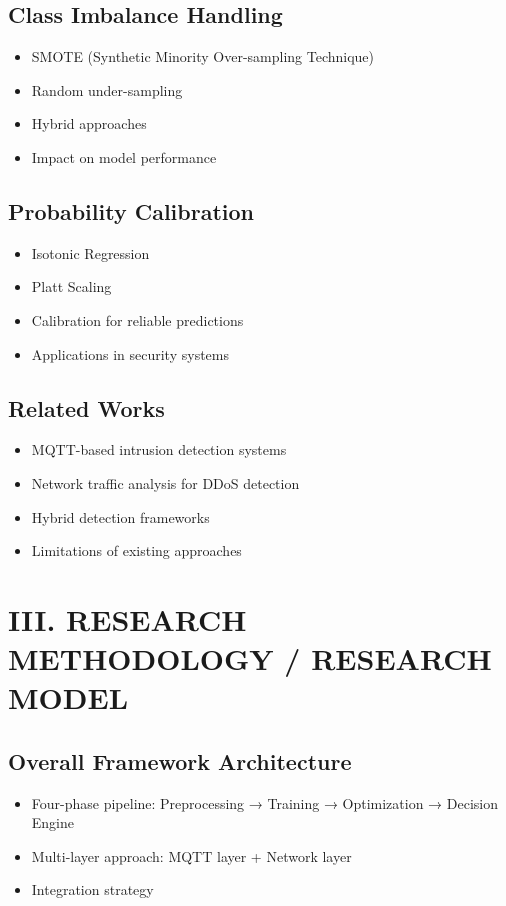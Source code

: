 \documentclass[conference]{IEEEtran}
\begin{document}
\subsection{Class Imbalance Handling}
\begin{itemize}
    \item SMOTE (Synthetic Minority Over-sampling Technique)
    \item Random under-sampling
    \item Hybrid approaches
    \item Impact on model performance
\end{itemize}

\subsection{Probability Calibration}
\begin{itemize}
    \item Isotonic Regression
    \item Platt Scaling
    \item Calibration for reliable predictions
    \item Applications in security systems
\end{itemize}

\subsection{Related Works}
\begin{itemize}
    \item MQTT-based intrusion detection systems
    \item Network traffic analysis for DDoS detection
    \item Hybrid detection frameworks
    \item Limitations of existing approaches
\end{itemize}

\section{III. RESEARCH METHODOLOGY / RESEARCH MODEL}

\subsection{Overall Framework Architecture}
\begin{itemize}
    \item Four-phase pipeline: Preprocessing → Training → Optimization → Decision Engine
    \item Multi-layer approach: MQTT layer + Network layer
    \item Integration strategy
\end{itemize}
\end{document}
